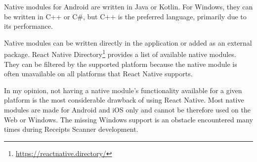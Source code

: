 \documentclass[
  printed, %
  table,   %
  oneside, %
  lof,     %
  lot,     %
]{fithesis3}
\begin{document}
Native modules for Android are written in Java or Kotlin.
For Windows, they can be written in C++ or C\#, but C++ is the preferred language, primarily due to its performance.

Native modules can be written directly in the application or added as an external package. React Native Directory\footnote{\url{https://reactnative.directory/}} provides a list of available native modules. They can be filtered by the supported platform because the native module is often unavailable on all platforms that React Native supports.

In my opinion, not having a native module's functionality available for a given platform is the most considerable drawback of using React Native.
Most native modules are made for Android and iOS only and cannot be therefore used on the Web or Windows. The missing Windows support is an obstacle encountered many times during Receipts Scanner development.
\end{document}
